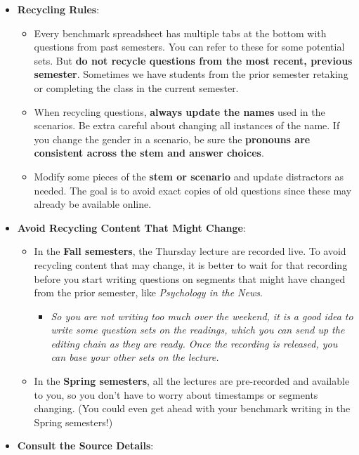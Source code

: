 \documentclass[
]{article}
\providecommand{\tightlist}{%
  \setlength{\itemsep}{0pt}\setlength{\parskip}{0pt}}
\begin{document}
\begin{itemize}
\tightlist
\item
  \textbf{Recycling Rules}:

  \begin{itemize}
  \tightlist
  \item
    Every benchmark spreadsheet has multiple tabs at the bottom with questions from past semesters. You can refer to these for some potential sets. But \textbf{do not recycle questions from the most recent, previous semester}. Sometimes we have students from the prior semester retaking or completing the class in the current semester.
  \item
    When recycling questions, \textbf{always update the names} used in the scenarios. Be extra careful about changing all instances of the name. If you change the gender in a scenario, be sure the \textbf{pronouns are consistent across the stem and answer choices}.
  \item
    Modify some pieces of the \textbf{stem or scenario} and update distractors as needed. The goal is to avoid exact copies of old questions since these may already be available online.
  \end{itemize}
\item
  \textbf{Avoid Recycling Content That Might Change}:

  \begin{itemize}
  \tightlist
  \item
    In the \textbf{Fall semesters}, the Thursday lecture are recorded live. To avoid recycling content that may change, it is better to wait for that recording before you start writing questions on segments that might have changed from the prior semester, like \emph{Psychology in the News}.

    \begin{itemize}
    \tightlist
    \item
      \emph{So you are not writing too much over the weekend, it is a good idea to write some question sets on the readings, which you can send up the editing chain as they are ready. Once the recording is released, you can base your other sets on the lecture.}\\
    \end{itemize}
  \item
    In the \textbf{Spring semesters}, all the lectures are pre-recorded and available to you, so you don't have to worry about timestamps or segments changing. (You could even get ahead with your benchmark writing in the Spring semesters!)
  \end{itemize}
\item
  \textbf{Consult the Source Details}:


\end{itemize}
\end{document}
